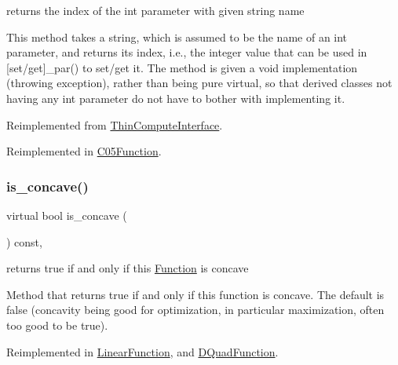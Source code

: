 returns the index of the int parameter with given string name 

This method takes a string, which is assumed to be the name of an int parameter, and returns its index, i.\+e., the integer value that can be used in \mbox{[}set/get\mbox{]}\+\_\+par() to set/get it. The method is given a void implementation (throwing exception), rather than being pure virtual, so that derived classes not having any int parameter do not have to bother with implementing it. 

Reimplemented from \mbox{\hyperlink{class_s_m_spp__di__unipi__it_1_1_thin_compute_interface_a69c6857c4288135135e8b6bbcf24252a}{Thin\+Compute\+Interface}}.



Reimplemented in \mbox{\hyperlink{class_s_m_spp__di__unipi__it_1_1_c05_function_ae281b6699b0707a5cdc1e82b76d26c09}{C05\+Function}}.

\mbox{\label{class_s_m_spp__di__unipi__it_1_1_function_a123711e22aabb119629862cf3cb791de}} 
\subsubsection{\texorpdfstring{is\+\_\+concave()}{is\_concave()}}
{\footnotesize\ttfamily virtual bool is\+\_\+concave (\begin{DoxyParamCaption}\item[{void}]{ }\end{DoxyParamCaption}) const\hspace{0.3cm}{\ttfamily [inline]}, {\ttfamily [virtual]}}



returns true if and only if this \mbox{\hyperlink{class_s_m_spp__di__unipi__it_1_1_function}{Function}} is concave 

Method that returns true if and only if this function is concave. The default is false (concavity being good for optimization, in particular maximization, often too good to be true). 

Reimplemented in \mbox{\hyperlink{class_s_m_spp__di__unipi__it_1_1_linear_function_ac5169a9ee09d66d4e9078d0350ea9142}{Linear\+Function}}, and \mbox{\hyperlink{class_s_m_spp__di__unipi__it_1_1_d_quad_function_abdb6d9788add66498dda476d9f5f1ff7}{D\+Quad\+Function}}.

